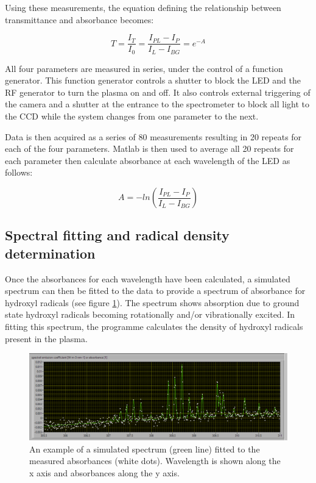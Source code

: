 \documentclass[11pt, oneside]{article}   	%
\begin{document}
Using these measurements, the equation defining the relationship between transmittance and absorbance becomes:

\begin{equation} \label{eqn:4ParamTransmittance}
    T = \frac{I_T}{I_0} = \frac{I_{PL} - I_P}{I_L - I_{BG}} = e^{-A}
\end{equation}

All four parameters are measured in series, under the control of a function generator.
This function generator controls a shutter to block the LED and the RF generator to turn the plasma on and off. It also controls external triggering of the camera and a shutter at the entrance to the spectrometer to block all light to the CCD while the system changes from one parameter to the next. 

Data is then acquired as a series of 80 measurements resulting in 20 repeats for each of the four parameters.
Matlab is then used to average all 20 repeats for each parameter then calculate absorbance at each wavelength of the LED as follows:

\begin{equation}\label{eqn:Absorbance}
    A = -ln(\frac{I_{PL} - I_P}{I_L - I_{BG}})
\end{equation}

\subsection{Spectral fitting and radical density determination}

Once the absorbances for each wavelength have been calculated, a simulated spectrum can then be fitted to the data to provide a spectrum of absorbance for hydroxyl radicals (see figure \ref{fig:SpectrumFitting}). 
The spectrum shows absorption due to ground state hydroxyl radicals becoming rotationally and/or vibrationally excited.
In fitting this spectrum, the programme calculates the density of hydroxyl radicals present in the plasma.

\begin{figure}
    \centering
    \includegraphics[width=\textwidth]{Figures/SpectrumFitting.png}
    \caption{An example of a simulated spectrum (green line) fitted to the measured absorbances (white dots). Wavelength is shown along the x axis and absorbances along the y axis.}
    \label{fig:SpectrumFitting}
\end{figure}
\end{document}
